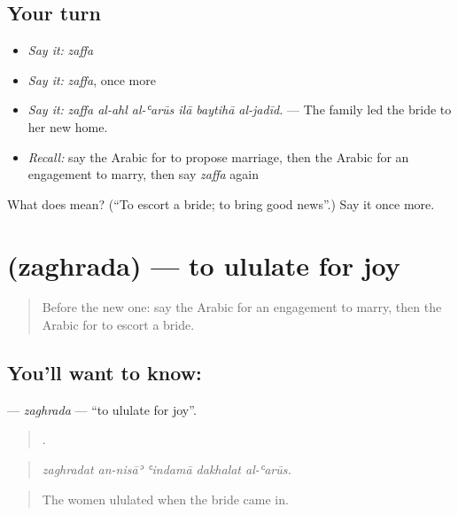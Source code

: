 \subsection*{Your turn}
\begin{itemize}
\raggedright
  \item \emph{Say it:} \emph{zaffa}
  \item \emph{Say it:} \emph{zaffa}, once more
  \item \emph{Say it:} \emph{zaffa al-ahl al-ʿarūs ilā baytihā al-jadīd.} — The family led the bride to her new home.
  \item \emph{Recall:} say the Arabic for to propose marriage, then the Arabic for an engagement to marry, then say \emph{zaffa} again
\end{itemize}

\begin{tcolorbox}[breakable,colback=teal!4,colframe=teal!35!black,title={Before you move on}]
What does  mean? (\textquotedblleft{}To escort a bride; to bring good news\textquotedblright{}.) Say it once more.
\end{tcolorbox}
\section[\texorpdfstring{\ar{زغرد} (zaghrada)}{زغرد (zaghrada)}]{ (zaghrada) — to ululate for joy}

\label{lesson:AR-C306-zaghrada}



\begin{quote}
Before the new one: say the Arabic for an engagement to marry, then the Arabic for to escort a bride.
\end{quote}

\subsection*{You'll want to know: }
\textbf{} — \emph{zaghrada} — \textquotedblleft{}to ululate for joy\textquotedblright{}.

\begin{quote}
    .
\end{quote}

\begin{quote}
\emph{zaghradat an-nisāʾ ʿindamā dakhalat al-ʿarūs.}
\end{quote}

\begin{quote}
The women ululated when the bride came in.
\end{quote}

